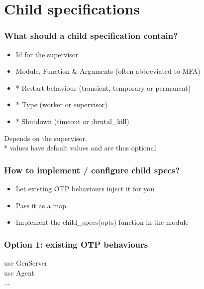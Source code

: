 \section{Child specifications}

\frame{\tableofcontents[currentsection]}


\begin{frame}
    \frametitle{What should a child specification contain?}
    \begin{itemize}
        \item Id for the supervisor
        \item Module, Function \& Arguments (often abbreviated to MFA)
        \item * Restart behaviour (transient, temporary or permanent)
        \item * Type (worker or supervisor)
        \item * Shutdown (timeout or :brutal\_kill)
    \end{itemize}

    \vfill

    \footnotesize
    Depends on the supervisor. \\
    * values have default values and are thus optional
\end{frame}

\begin{frame}
    \frametitle{How to implement / configure child specs?}
    \begin{itemize}
        \item Let existing OTP behaviours inject it for you
        \item Pass it as a map
        \item Implement the child\_specs(opts) function in the module
    \end{itemize}
\end{frame}

\begin{frame}
    \frametitle{Option 1: existing OTP behaviours}
    \begin{center}
        use GenServer \\
        use Agent \\
        ...
    \end{center}
\end{frame}

